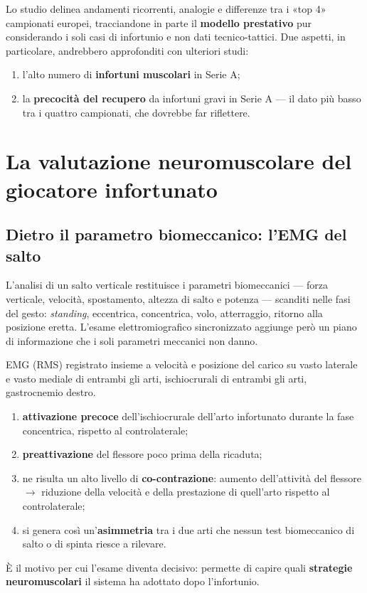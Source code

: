 Lo studio delinea andamenti ricorrenti, analogie e differenze tra i «top 4» campionati europei,
tracciandone in parte il \textbf{modello prestativo} pur considerando i soli casi di infortunio e
non dati tecnico-tattici. Due aspetti, in particolare, andrebbero approfonditi con ulteriori studi:
\begin{enumerate}
  \item l'alto numero di \textbf{infortuni muscolari} in Serie A;
  \item la \textbf{precocità del recupero} da infortuni gravi in Serie A --- il dato più basso tra i
    quattro campionati, che dovrebbe far riflettere.
\end{enumerate}

\section{La valutazione neuromuscolare del giocatore infortunato}

\subsection{Dietro il parametro biomeccanico: l'EMG del salto}

L'analisi di un salto verticale restituisce i parametri biomeccanici --- forza verticale, velocità,
spostamento, altezza di salto e potenza --- scanditi nelle fasi del gesto: \textit{standing},
eccentrica, concentrica, volo, atterraggio, ritorno alla posizione eretta. L'esame elettromiografico
sincronizzato aggiunge però un piano di informazione che i soli parametri meccanici non danno.

EMG (RMS) registrato insieme a velocità e posizione del carico su vasto laterale e vasto mediale di
entrambi gli arti, ischiocrurali di entrambi gli arti, gastrocnemio destro.

\begin{enumerate}
  \item \textbf{attivazione precoce} dell'ischiocrurale dell'arto infortunato durante la fase
    concentrica, rispetto al controlaterale;
  \item \textbf{preattivazione} del flessore poco prima della ricaduta;
  \item ne risulta un alto livello di \textbf{co-contrazione}: aumento dell'attività del flessore
    $\rightarrow$ riduzione della velocità e della prestazione di quell'arto rispetto al
    controlaterale;
  \item si genera così un'\textbf{asimmetria} tra i due arti che nessun test biomeccanico di salto o
    di spinta riesce a rilevare.
\end{enumerate}
È il motivo per cui l'esame diventa decisivo: permette di capire quali \textbf{strategie
neuromuscolari} il sistema ha adottato dopo l'infortunio.

